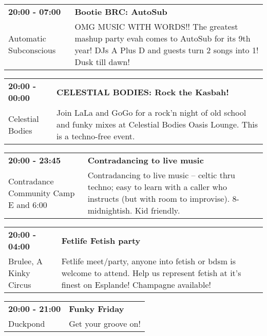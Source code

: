 \begin{tabular}{ p{1in} p{2.2in} }
    \textbf{20:00 - 07:00} & \textbf{Bootie BRC: AutoSub} \\
    Automatic Subconscious \newline  & OMG MUSIC WITH WORDS!! The greatest mashup party evah comes to AutoSub for its 9th year! DJs A Plus D and guests turn 2 songs into 1! Dusk till dawn! \\
    \hline 
\end{tabular}
    
\begin{tabular}{ p{1in} p{2.2in} }
    \textbf{20:00 - 00:00} & \textbf{CELESTIAL BODIES: Rock the Kasbah!} \\
    Celestial Bodies \newline  & Join LaLa and GoGo for a rock'n night of old school and funky mixes at Celestial Bodies Oasis Lounge.  This is a techno-free event. \\
    \hline 
\end{tabular}
    
\begin{tabular}{ p{1in} p{2.2in} }
    \textbf{20:00 - 23:45} & \textbf{Contradancing to live music} \\
    Contradance Community Camp \newline E  and 6:00 & Contradancing to live music -- celtic thru techno; easy to learn with a caller who instructs (but with room to improvise). 8-midnightish. Kid friendly. \\
    \hline 
\end{tabular}
    
\begin{tabular}{ p{1in} p{2.2in} }
    \textbf{20:00 - 04:00} & \textbf{Fetlife Fetish party} \\
    Brulee, A Kinky Circus \newline  & Fetlife meet/party, anyone into fetish or bdsm is welcome to attend. Help us represent fetish at it's finest on Esplande! Champagne available! \\
    \hline 
\end{tabular}
    
\begin{tabular}{ p{1in} p{2.2in} }
    \textbf{20:00 - 21:00} & \textbf{Funky Friday} \\
    Duckpond \newline  & Get your groove on! \\
    \hline 
\end{tabular}
    
